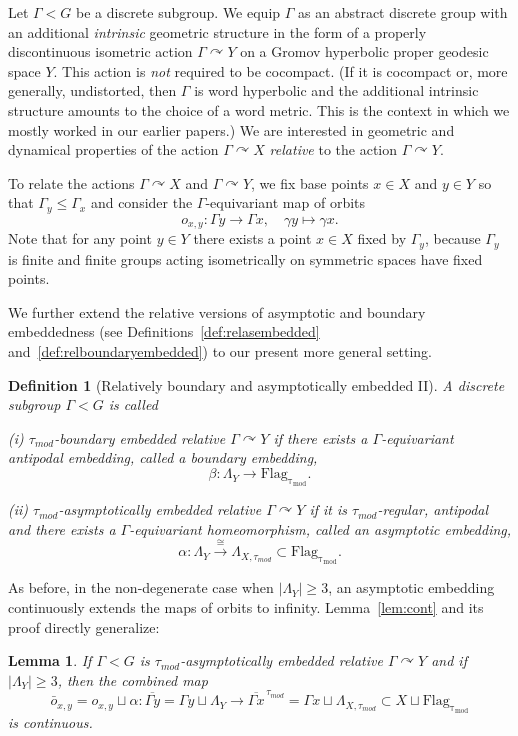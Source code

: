 \documentclass[12pt]{article}
\theoremstyle{boldplain}
\newtheorem{lem}[equation]{Lemma}
\theoremstyle{bolddefinition}
\newtheorem{dfn}[equation]{Definition}
\numberwithin{equation}{section}
\def\al{\alpha}
\def\ga{\gamma}
\def\Ga{\Gamma}
\def\acts{\curvearrowright}
\def\Flagt{\operatorname{Flag_{\tau_{mod}}}}
\def\LaXt{\Lambda_{X,\tau_{mod}}}
\def\LaY{\Lambda_Y}
\def\ol{\overline}
\def\taumod{\tau_{mod}}
\begin{document}
Let $\Ga<G$ be a discrete subgroup.
We equip $\Ga$ as an abstract discrete group 
with an additional {\em intrinsic} geometric structure 
in the form of a properly discontinuous isometric action $\Ga\acts Y$ on a Gromov hyperbolic proper geodesic space $Y$.
This action is {\em not} required to be cocompact.
(If it is cocompact or, more generally, undistorted,
then $\Ga$ is word hyperbolic 
and the additional intrinsic structure amounts to the choice of a word metric.
This is the context in which we mostly worked in our earlier papers.)
We are interested in 
geometric and dynamical properties of the action $\Ga\acts X$ 
{\em relative} to the action $\Ga\acts Y$.

To relate the actions $\Ga\acts X$ and $\Ga\acts Y$,
we fix base points $x\in X$ and $y\in Y$ so that $\Ga_y\leq\Ga_x$ 
and consider the $\Ga$-equivariant map of orbits 
$$ o_{x,y}: \Ga y \to \Ga x , \quad \ga y \mapsto \ga x .$$
Note that for any point $y\in Y$ there exists a point $x\in X$ fixed by $\Ga_y$, 
because $\Ga_y$ is finite and finite groups acting isometrically on symmetric spaces have fixed points. 

We further extend the relative versions of asymptotic and boundary embeddedness 
(see Definitions~\ref{def:relasembedded} and~\ref{def:relboundaryembedded})
to our present more general setting. 
\begin{dfn}[Relatively boundary and asymptotically embedded II]
\label{def:relembedded}
A discrete subgroup $\Ga<G$ is called 

(i) {\em $\taumod$-boundary embedded relative $\Ga\acts Y$}
if there exists a $\Ga$-equivariant antipodal embedding,
called a {\em boundary embedding},
$$\beta:\LaY\to\Flagt .$$

(ii) {\em $\taumod$-asymptotically embedded relative $\Ga\acts Y$}
if it is $\taumod$-regular, antipodal
and there exists a $\Ga$-equivariant homeomorphism,
called an {\em asymptotic embedding},
$$\al:\LaY\stackrel{\cong}{\to}\LaXt \subset\Flagt .$$ 
\end{dfn}

As before,
in the non-degenerate case when $|\LaY|\geq3$,
an asymptotic embedding continuously extends the maps of orbits to infinity.
Lemma~\ref{lem:cont} and its proof directly generalize:
\begin{lem}
\label{lem:asmbdcntxt}
If $\Ga<G$ is $\taumod$-asymptotically embedded
relative $\Ga\acts Y$ 
and if $|\LaY|\geq3$, 
then the combined map 
$$ \bar o_{x,y}=o_{x,y}\sqcup\al : \ol{\Ga y}=\Ga y\sqcup\LaY \to \ol{\Ga x}^{\,\taumod}= \Ga x\sqcup\LaXt \subset X\sqcup\Flagt $$
is continuous.
\end{lem}
\end{document}
